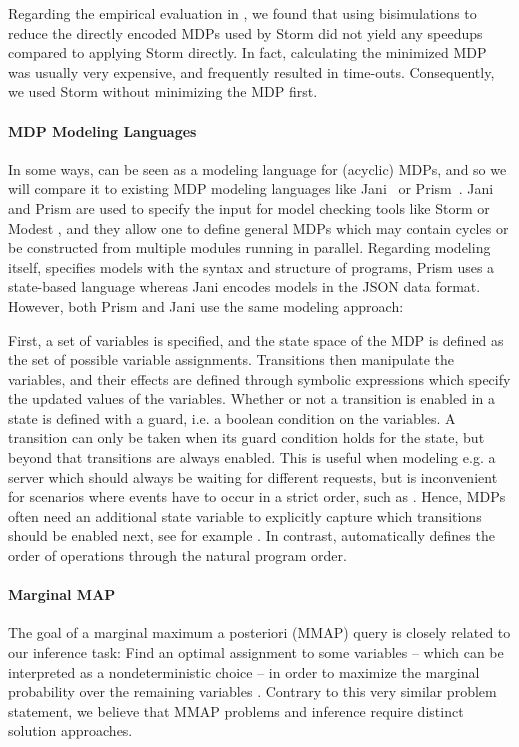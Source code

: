Regarding the empirical evaluation in , we found that using bisimulations to reduce the directly encoded MDPs used by Storm did not yield any speedups compared to applying Storm directly.
In fact, calculating the minimized MDP was usually very expensive, and frequently resulted in time-outs.
Consequently, we used Storm without minimizing the MDP first.


\paragraph{MDP Modeling Languages}
	In some ways, \NDICE can be seen as a modeling language for (acyclic) MDPs, and so we will compare it to existing MDP modeling languages like Jani~\cite{budde2017jani} or Prism~\cite{KNP11}.
	Jani and Prism are used to specify the input for model checking tools like Storm \cite{hensel2022probabilistic} or Modest \cite{hartmanns2014modest}, and they allow one to define general MDPs which may contain cycles or be constructed from multiple modules running in parallel. 
	Regarding modeling itself, \NDICE specifies models with the syntax and structure of programs, Prism uses a state-based language whereas Jani encodes models in the JSON data format. 
	However, both Prism and Jani use the same modeling approach:	
	
	First, a set of variables is specified, and the state space of the MDP is defined as the set of possible variable assignments. 
	Transitions then manipulate the variables, and their effects are defined through symbolic expressions which specify the updated values of the variables.
	Whether or not a transition is enabled in a state is defined with a guard, i.e. a boolean condition on the variables. 
	A transition can only be taken when its guard condition holds for the state, but beyond that transitions are always enabled.
	This is useful when modeling e.g. a server which should always be waiting for different requests, but is inconvenient for scenarios where events have to occur in a strict order, such as .
	 Hence, MDPs often need an additional state variable to explicitly capture which transitions should be enabled next, see for example \citet{d1997bounded}.
	 In contrast, \NDICE automatically defines the order of operations through the natural program order.



\paragraph{Marginal MAP}
The goal of a marginal maximum a posteriori (MMAP) query is closely related to our inference task: 
Find an optimal assignment to some variables -- which can be interpreted as a nondeterministic choice -- in order to maximize the marginal probability over the remaining variables \cite{liu2013variational, choi2022solving}.
Contrary to this very similar problem statement, we believe that MMAP problems and \NDICE inference require distinct solution approaches.

